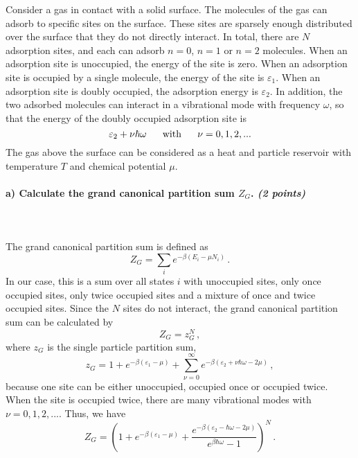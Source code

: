 Consider a gas in contact with a solid surface. The molecules of the gas 
can adsorb to specific sites on the surface. These sites are sparsely 
enough distributed over the surface that they do not directly interact. 
In total, there are $N$ adsorption sites, and each can adsorb $n=0$, 
$n=1$ or $n=2$ molecules.  When an adsorption site is unoccupied, the 
energy of the site is zero. When an adsorption site is occupied by a 
single molecule, the energy of the site is $\varepsilon_1$. When an 
adsorption site is doubly occupied, the adsorption energy is 
$\varepsilon_2$. In addition, the two adsorbed molecules can interact in 
a vibrational mode with frequency $\omega$, so that the energy of the 
doubly occupied adsorption site is
$$\varepsilon_2+\nu\hbar\omega
\ \ \ \ \ \textnormal{with}\ \ \ \ \ 
\nu=0,1,2,...$$
The gas above the surface can be considered as a heat and particle 
reservoir with temperature $T$ and chemical potential $\mu$.

\paragraph{a) Calculate the grand canonical partition sum $Z_G$. 
    \textit{(2 points)}
} \ \\
\\
The grand canonical partition sum is defined as
\begin{equation}
	Z_G = \sum_i e^{-\beta(E_i - \mu N_i)} \,.
\end{equation}
In our case, this is a sum over all states $i$ with unoccupied sites, only once 
occupied sites, only twice occupied sites and a mixture of once and
twice occupied sites.
Since the $N$ sites do not interact, the grand canonical partition sum
can be calculated by
\begin{equation}
	Z_G  = z_G^N \,,
\end{equation}
where $z_G$ is the single particle partition sum,
\begin{equation}
	z_G = 1 + e^{-\beta(\varepsilon_1 - \mu)} + \sum_{\nu=0}^{\infty} 
		e^{-\beta(\varepsilon_2 + \nu\hbar\omega - 2\mu)} \,,
\end{equation}
because one site can be either unoccupied, occupied once or occupied
twice. When the site is occupied twice, there are many vibrational modes
with $\nu=0,1,2,...$. Thus, we have
\begin{equation}
	Z_G = \left( 1 + e^{-\beta (\varepsilon_1 - \mu)} 
		+ \frac{e^{-\beta(\varepsilon_2 - \hbar\omega - 2\mu)}}{e^{\beta\hbar\omega}-1}  \right)^N \,.
\end{equation}

